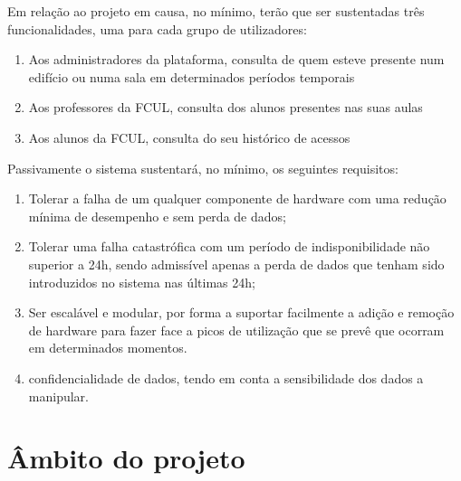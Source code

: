 \documentclass[a4paper]{report}
\begin{document}
Em relação ao projeto em causa, no mínimo, terão que ser sustentadas três funcionalidades, uma para cada grupo de utilizadores:
\begin{enumerate}
\item Aos administradores da plataforma, consulta de quem esteve presente num edifício ou numa sala em determinados períodos temporais %
\item Aos professores da FCUL, consulta dos alunos presentes nas suas aulas
\item Aos alunos da FCUL, consulta do seu histórico de acessos
\end{enumerate}

Passivamente o sistema sustentará, no mínimo, os seguintes requisitos:
\begin{enumerate}
\item Tolerar a falha de um qualquer componente de hardware com uma redução mínima de desempenho e sem perda de dados;
\item Tolerar uma falha catastrófica com um período de indisponibilidade não superior a 24h, sendo admissível apenas a perda de dados que tenham sido introduzidos no sistema nas últimas 24h;
\item Ser escalável e modular, por forma a suportar facilmente a adição e remoção de hardware para fazer face a picos de utilização que se prevê que ocorram em determinados momentos.
\item confidencialidade de dados, tendo em conta a sensibilidade dos dados a manipular.
\end{enumerate}
\chapter{Âmbito do projeto}
\end{document}
